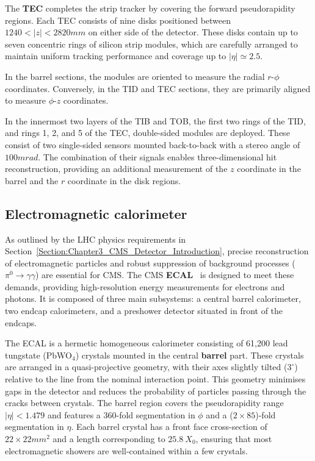 The \textbf{TEC} completes the strip tracker by covering the forward pseudorapidity regions. Each TEC consists of nine disks positioned between $1240 < |z| < 2820\unit{mm}$ on either side of the detector. These disks contain up to seven concentric rings of silicon strip modules, which are carefully arranged to maintain uniform tracking performance and coverage up to $|\eta| \simeq 2.5$.

In the barrel sections, the modules are oriented to measure the radial $r\text{-}\phi$ coordinates. Conversely, in the TID and TEC sections, they are primarily aligned to measure $\phi\text{-}z$ coordinates.

In the innermost two layers of the TIB and TOB, the first two rings of the TID, and rings 1, 2, and 5 of the TEC, double-sided modules are deployed. These consist of two single-sided sensors mounted back-to-back with a stereo angle of $100\unit{mrad}$. The combination of their signals enables three-dimensional hit reconstruction, providing an additional measurement of the $z$ coordinate in the barrel and the $r$ coordinate in the disk regions.

\subsection{Electromagnetic calorimeter}

As outlined by the LHC physics requirements in Section~\ref{Section:Chapter3_CMS_Detector_Introduction}, precise reconstruction of electromagnetic particles and robust suppression of background processes ($\pi^0 \to \gamma \gamma$) are essential for CMS. The CMS \textbf{ECAL}~\cite{LHC_CMS,CMS_Detector_Run3,CMS_ECAL_Performance_Run2} is designed to meet these demands, providing high-resolution energy measurements for electrons and photons. It is composed of three main subsystems: a central barrel calorimeter, two endcap calorimeters, and a preshower detector situated in front of the endcaps.

The ECAL is a hermetic homogeneous calorimeter consisting of 61,200 lead tungstate (PbWO$_4$) crystals mounted in the central \textbf{barrel} part. These crystals are arranged in a quasi-projective geometry, with their axes slightly tilted ($3^\circ$) relative to the line from the nominal interaction point. This geometry minimises gaps in the detector and reduces the probability of particles passing through the cracks between crystals. The barrel region covers the pseudorapidity range $|\eta| < 1.479$ and features a 360-fold segmentation in $\phi$ and a ($2 \times 85$)-fold segmentation in $\eta$. Each barrel crystal has a front face cross-section of $22 \times 22\unit{mm}^2$ and a length corresponding to $25.8~X_0$, ensuring that most electromagnetic showers are well-contained within a few crystals.

